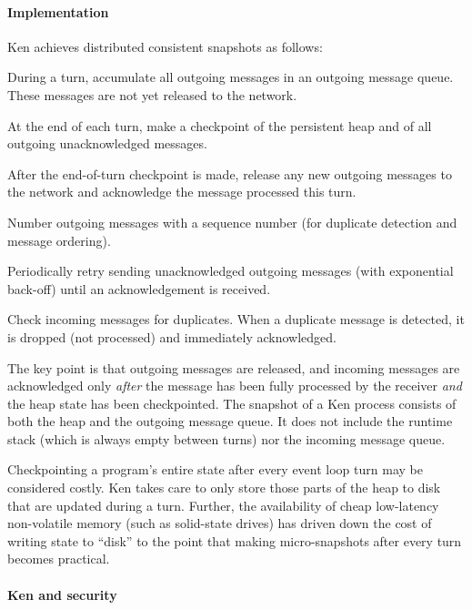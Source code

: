\documentclass{llncs}
\begin{document}
\paragraph{Implementation} 

Ken achieves distributed consistent snapshots as follows:

\begin{itemize*}
  \item During a turn, accumulate all outgoing messages in an outgoing message queue. These messages are not yet released to the network.
  \item At the end of each turn, make a checkpoint of the persistent heap and of all outgoing unacknowledged messages.
  \item After the end-of-turn checkpoint is made, release any new outgoing messages to the network and acknowledge the message processed this turn.
  \item Number outgoing messages with a sequence number (for duplicate detection and message ordering).
  \item Periodically retry sending unacknowledged outgoing messages (with exponential back-off) until an acknowledgement is received.
  \item Check incoming messages for duplicates. When a duplicate message is detected, it is dropped (not processed) and immediately acknowledged.
\end{itemize*}

The key point is that outgoing messages are released, and incoming messages are acknowledged only \emph{after} the message has been fully processed by the receiver \emph{and} the heap state has been checkpointed. The snapshot of a Ken process consists of both the heap and the outgoing message queue. It does not include the runtime stack (which is always empty between turns) nor the incoming message queue.

Checkpointing a program's entire state after every event loop turn may be considered costly. Ken takes care to only store those parts of the heap to disk that are updated during a turn. Further, the availability of cheap low-latency non-volatile memory (such as solid-state drives) has driven down the cost of writing state to ``disk'' to the point that making micro-snapshots after every turn becomes practical.

\paragraph{Ken and security}
\end{document}
